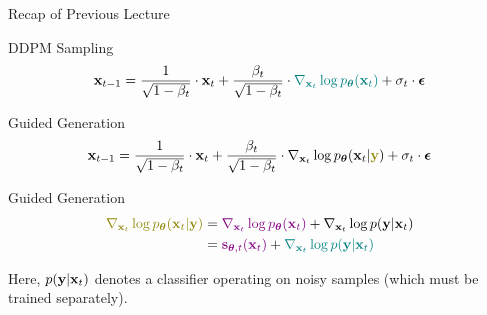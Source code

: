 \documentclass{beamer}
\begin{document}
\begin{frame}{Recap of Previous Lecture}
	\begin{block}{DDPM Sampling}
		\vspace{-0.3cm}
		\[
			\mathbf{x}_{t - 1} = \frac{1}{\sqrt{1 - \beta_t}} \cdot \mathbf{x}_t + \frac{\beta_t}{\sqrt{1 - \beta_t}} \cdot {\color{teal} \nabla_{\mathbf{x}_t} \log p_{\boldsymbol{\theta}}(\mathbf{x}_t)} +  \sigma_t \cdot \boldsymbol{\epsilon}
		\]
		\vspace{-0.5cm}
	\end{block}
	\begin{block}{Guided Generation}
		\vspace{-0.5cm}
		\[
			\bx_{t - 1} =  \frac{1}{\sqrt{1 - \beta_t}}\cdot \bx_t +  \frac{\beta_t}{\sqrt{1 - \beta_t}}  \cdot  \nabla_{\bx_t} \log \pt(\bx_t | {\color{olive}\by}) +  \sigma_t \cdot \bepsilon
		\]
		\vspace{-0.5cm}
	\end{block}
	\begin{block}{Guided Generation}
		\vspace{-0.5cm}
		\begin{align*}
			{\color{olive}\nabla_{\bx_t} \log \pt(\bx_t | \by)} &
			= {\color{violet}\nabla_{\bx_t} \log \pt(\bx_t)} + \nabla_{\bx_t} \log p(\by | \bx_t) \\
			&= {\color{violet} \bs_{\btheta, t}(\bx_t)} + {\color{teal}\nabla_{\bx_t} \log p(\by | \bx_t)}
		\end{align*}
		\vspace{-0.5cm}
	\end{block}
	Here, $p(\mathbf{y} | \mathbf{x}_t)$ denotes a classifier operating on noisy samples (which must be trained separately).
\end{frame}
\end{document}

